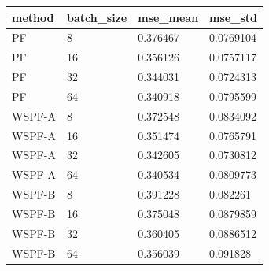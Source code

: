 \begin{tabular}{llll}
\hline
method & batch\_size & mse\_mean & mse\_std \\
\hline
PF & 8 & 0.376467 & 0.0769104 \\
PF & 16 & 0.356126 & 0.0757117 \\
PF & 32 & 0.344031 & 0.0724313 \\
PF & 64 & 0.340918 & 0.0795599 \\
WSPF-A & 8 & 0.372548 & 0.0834092 \\
WSPF-A & 16 & 0.351474 & 0.0765791 \\
WSPF-A & 32 & 0.342605 & 0.0730812 \\
WSPF-A & 64 & 0.340534 & 0.0809773 \\
WSPF-B & 8 & 0.391228 & 0.082261 \\
WSPF-B & 16 & 0.375048 & 0.0879859 \\
WSPF-B & 32 & 0.360405 & 0.0886512 \\
WSPF-B & 64 & 0.356039 & 0.091828 \\
\hline
\end{tabular}
